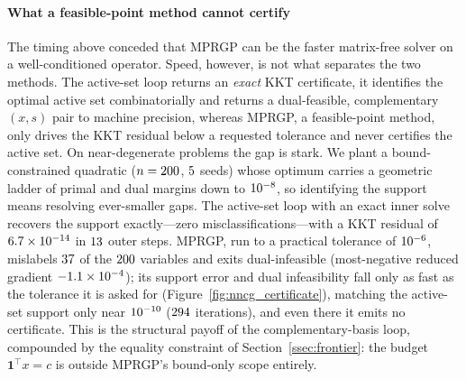 \begin{table}[ht]
\centering
\footnotesize

\caption{Matrix-free deblurring: wall-clock (s) against problem size $n = N^2$, the two
matrix-free methods (MPRGP and the active-set CG loop) versus the dense Lawson--Hanson,
Clarabel, and OSQP (Gaussian blur $\sigma = 2$, ridge $\alpha = 10^{-3}$). ``dense $A$ (GB)''
is the storage the dense solvers would need for the Gram operator, which the matrix-free
methods never form; ``---'' marks sizes where that operator exceeds the benchmark's storage
budget and the dense solvers are not run. The active-set CG loop is run without a
preconditioner, as is MPRGP.}
\label{tab:nncg_deblur}
\end{table}

\paragraph{What a feasible-point method cannot certify}

The timing above conceded that MPRGP can be the faster matrix-free solver on a well-conditioned
operator. Speed, however, is not what separates the two methods. The active-set loop returns an
\emph{exact} KKT certificate, it identifies the optimal active set combinatorially and returns
a dual-feasible, complementary $(x, s)$ pair to machine precision, whereas MPRGP, a
feasible-point method, only drives the KKT residual below a requested tolerance and never
certifies the active set. On near-degenerate problems the gap is stark. We plant a
bound-constrained quadratic ($n = 200{}$, $5{}$ seeds) whose optimum
carries a geometric ladder of primal and dual margins down to $10^{-8}{}$, so
identifying the support means resolving ever-smaller gaps. The active-set loop with an exact
inner solve recovers the support exactly---zero misclassifications---with a KKT residual of
$6.7\times10^{-14}{}$ in $13{}$ outer steps. MPRGP, run to a practical tolerance of
$10^{-6}{}$, mislabels $37{}$ of the $200{}$ variables and exits
dual-infeasible (most-negative reduced gradient $-1.1\times10^{-4}{}$); its support error and
dual infeasibility fall only as fast as the tolerance it is asked for
(Figure~\ref{fig:nncg_certificate}), matching the active-set support only near
$10^{-10}{}$ ($294{}$ iterations), and even there it emits no
certificate. This is the structural payoff of the complementary-basis loop, compounded by the
equality constraint of Section~\ref{ssec:frontier}: the budget $\mathbf{1}^\top x = c$ is
outside MPRGP's bound-only scope entirely.

